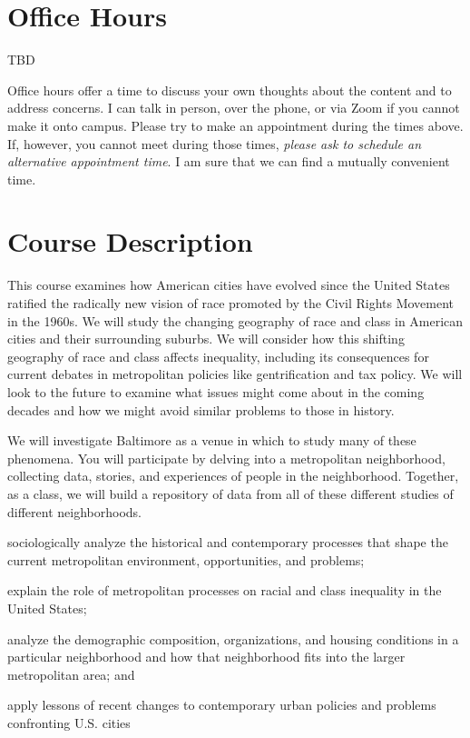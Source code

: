 \documentclass[11pt]{syllabus}
\newcommand{\officehourtimes}{TBD}
\begin{document}
\maketitle 

\section{Office Hours}
\officehourtimes

Office hours offer a time to discuss your own thoughts about the content and to address concerns. I can talk in person, over the phone, or via Zoom if you cannot make it onto campus. Please try to make an appointment during the times above. If, however, you cannot meet during those times, \emph{please ask to schedule an alternative appointment time}. I am sure that we can find a mutually convenient time. 

\section{Course Description}
This course examines how American cities have evolved since the United States ratified the radically new vision of race promoted by the Civil Rights Movement in the 1960s. We will study the changing geography of race and class in American cities and their surrounding suburbs. We will consider how this shifting geography of race and class affects inequality, including its consequences for current debates in metropolitan policies like gentrification and tax policy. We will look to the future to examine what issues might come about in the coming decades and how we might avoid similar problems to those in history. 

We will investigate Baltimore as a venue in which to study many of these phenomena. You will participate by delving into a metropolitan neighborhood, collecting data, stories, and experiences of people in the neighborhood. Together, as a class, we will build a repository of data from all of these different studies of different neighborhoods. 

\begin{objectives}
\item sociologically analyze the historical and contemporary processes that shape the current metropolitan environment, opportunities, and problems;
\item explain the role of metropolitan processes on racial and class inequality in the United States;
\item analyze the demographic composition, organizations, and housing conditions in a particular neighborhood and how that neighborhood fits into the larger metropolitan area; and
\item apply lessons of recent changes to contemporary urban policies and problems confronting U.S. cities
\end{objectives}
\end{document}
